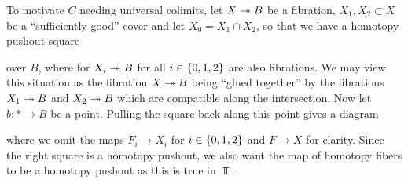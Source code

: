 To motivate $C$ needing universal colimits, let $X\xtwoheadrightarrow{} B$ be a fibration, $X_1,X_2\subset X$ be a ``sufficiently good'' cover and let $X_0=X_1\cap X_2$, so that we have a homotopy pushout square
\begin{center}
\end{center}
over $B$, where for $X_i\xtwoheadrightarrow{} B$ for all $i\in\left\lbrace0,1,2\right\rbrace$ are also fibrations.
We may view this situation as the fibration $X\xtwoheadrightarrow{} B$ being ``glued together'' by the fibrations $X_1\xtwoheadrightarrow{} B$ and $X_2\xtwoheadrightarrow{} B$ which are compatible along the intersection.
Now let $b\colon*\to B$ be a point. 
Pulling the square back along this point gives a diagram
\begin{center}
\end{center}
where we omit the maps $F_i\to X_i$ for $i\in\left\lbrace0,1,2\right\rbrace$ and $F\to X$ for clarity.
Since the right square is a homotopy pushout, we also want the map of homotopy fibers to be a homotopy pushout as this is true in $\Top$.

